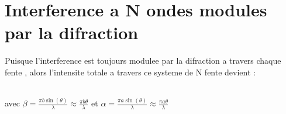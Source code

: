 \documentclass[12pt]{book}
\begin{document}
        \section{Interference a N ondes modules par la difraction}
            Puisque l'interference est toujours modulee par la difraction a travers chaque fente , alors l'intensite totale a travers ce systeme de N fente devient : \\
                \begin{center}
                    \\ 
                    avec $\beta = \frac{\pi b \sin(\theta)}{\lambda}\approx\frac{\pi b \theta}{\lambda}$ et $\alpha = \frac{\pi a \sin(\theta)}{\lambda}\approx\frac{\pi a \theta}{\lambda}$
                \end{center}
\end{document}
